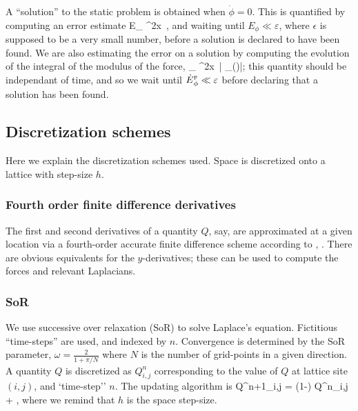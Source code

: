 \documentclass[a4paper, 12pt]{article}
\numberwithin{equation}{section}
\begin{document}
A ``solution'' to the static problem is obtained when $\dot{\phi}=0$. This is quantified by computing an error estimate
\bea
E_{\phi}  \int \dd^2x\, \dot{\phi},
\eea
and waiting until $E_{\phi}\ll \varepsilon$, where $\epsilon$ is supposed to be a very small number, before a solution is declared to have been found. We are also estimating the error on a solution by computing the evolution of the integral of the modulus of the force,
\bea
{}_{\phi}  \int \dd^2x\, \left| _{(\phi)}\right|;
\eea
this quantity should be independant of time, and so we wait until $\dot{E}{}^{\scriptscriptstyle{\textrm{F}}}_{\phi}\ll \varepsilon$ before declaring that a solution has been found.



\subsection{Discretization schemes}
Here we explain the discretization schemes used. Space is discretized onto a lattice with step-size $h$.

\subsubsection{Fourth order finite difference derivatives}
The first and second derivatives of a quantity $Q$, say, are approximated at a given location via a fourth-order accurate finite difference scheme according to
\bea
{} \approx {},
\eea
\bea
{} \approx {}.
\eea
There are obvious equivalents for the $y$-derivatives; these can be used to compute the forces and relevant Laplacians.

\subsubsection{SoR} 
We use successive over relaxation (SoR)   to solve Laplace's equation. Fictitious ``time-steps'' are used, and indexed by $n$. Convergence is determined by the SoR parameter, $\omega = \frac{2}{1+ {\pi}/{N}}$ where $N$ is the number of grid-points in a given direction. A quantity $Q$ is discretized as $Q^n_{i,j}$ corresponding to the value of $Q$ at lattice site $(i,j)$, and `time-step'' $n$. The updating algorithm is
\bea
Q^{n+1}_{i,j} = (1-\omega) Q^{n}_{i,j} + ,
\eea
where we remind that $h$ is the space step-size.
\end{document}
